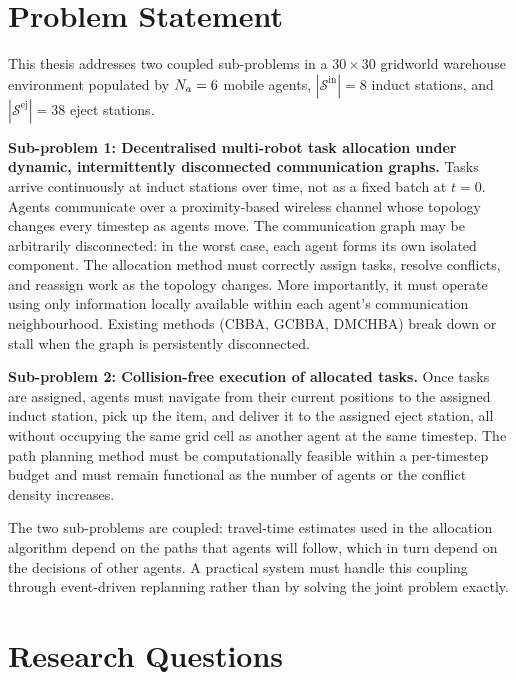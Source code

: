 \section{Problem Statement}
\label{sec:intro_problem}

This thesis addresses two coupled sub-problems in a $30 \times 30$ gridworld
warehouse environment populated by $N_a = 6$ mobile agents,
$|\mathcal{S}^{\text{in}}| = 8$ induct stations, and
$|\mathcal{S}^{\text{ej}}| = 38$ eject stations.

\textbf{Sub-problem 1: Decentralised multi-robot task allocation under dynamic,
intermittently disconnected communication graphs.}
Tasks arrive continuously at induct stations over time, not as a fixed batch at
$t = 0$.
Agents communicate over a proximity-based wireless channel whose topology
changes every timestep as agents move.
The communication graph may be arbitrarily disconnected: in the worst case,
each agent forms its own isolated component.
The allocation method must correctly assign tasks, resolve conflicts, and
reassign work as the topology changes. More importantly, it must operate
using only information locally
available within each agent's communication neighbourhood.
Existing methods (CBBA, GCBBA, DMCHBA) break down or stall when the graph is
persistently disconnected.

\textbf{Sub-problem 2: Collision-free execution of allocated tasks.}
Once tasks are assigned, agents must navigate from their current positions to
the assigned induct station, pick up the item, and deliver it to the assigned
eject station, all without occupying the same grid cell as another agent at the
same timestep.
The path planning method must be computationally feasible within a per-timestep
budget and must remain functional as the number of agents or the conflict
density increases.

The two sub-problems are coupled: travel-time estimates used in the allocation
algorithm depend on the paths that agents will follow, which in turn depend on
the decisions of other agents.
A practical system must handle this coupling through event-driven replanning
rather than by solving the joint problem exactly.


\section{Research Questions}
\label{sec:intro_questions}

